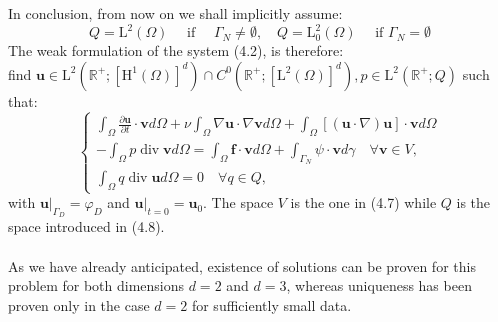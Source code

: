 \documentclass[11pt]{book}
\begin{document}
In conclusion, from now on we shall implicitly assume:
\begin{equation}
Q=\mathrm{L}^{2}(\Omega) \quad \text { if } \quad \Gamma_{N} \neq \emptyset, \quad Q=\mathrm{L}_{0}^{2}(\Omega) \quad \text { if } \Gamma_{N}=\emptyset
\end{equation}
The weak formulation of the system (4.2), is therefore: \\ 
find $\mathbf{u} \in \mathrm{L}^{2}\left(\mathbb{R}^{+} ;\left[\mathrm{H}^{1}(\Omega)\right]^{d}\right) \cap C^{0}\left(\mathbb{R}^{+} ;\left[\mathrm{L}^{2}(\Omega)\right]^{d}\right), p \in \mathrm{L}^{2}\left(\mathbb{R}^{+} ; Q\right)$ such that:
\begin{equation}
\left\{\begin{array}{l}
\int_{\Omega} \frac{\partial \mathbf{u}}{\partial t} \cdot \mathbf{v} d \Omega+\nu \int_{\Omega} \nabla \mathbf{u} \cdot \nabla \mathbf{v} d \Omega+\int_{\Omega}[(\mathbf{u} \cdot \nabla) \mathbf{u}] \cdot \mathbf{v} d \Omega \\
-\int_{\Omega} p \operatorname{div} \mathbf{v} d \Omega=\int_{\Omega} \mathbf{f} \cdot \mathbf{v} d \Omega+\int_{\Gamma_{N}} \psi \cdot \mathbf{v} d \gamma \quad \forall \mathbf{v} \in V, \\
\int_{\Omega} q \operatorname{div} \mathbf{u} d \Omega=0 \quad \forall q \in Q,
\end{array}\right.
\end{equation}
with $\left.\mathbf{u}\right|_{\Gamma_{D}}=\varphi_{D}$ and $\left.\mathbf{u}\right|_{t=0}=\mathbf{u}_{0}$. The space $V$ is the one in (4.7) while $Q$ is the space introduced in (4.8).\\ \\
As we have already anticipated, existence of solutions can be proven for this problem for both dimensions $d=2$ and $d=3$, whereas uniqueness has been proven only in the case $d=2$ for sufficiently small data.\\ \\
\end{document}
